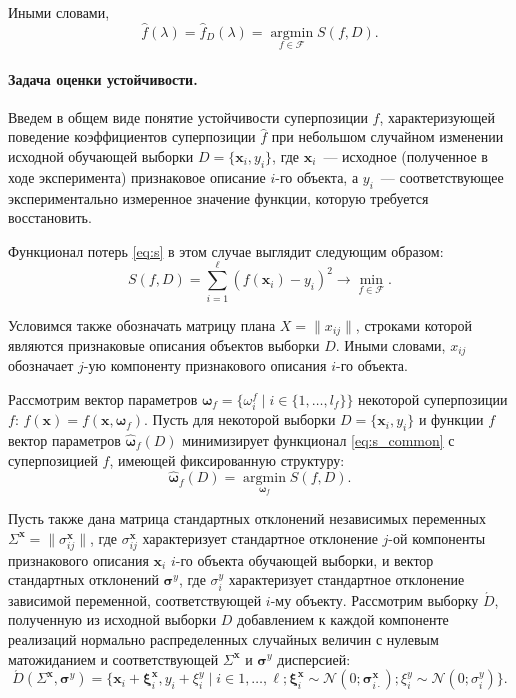 \documentclass[11pt,a4paper]{article}
\theoremstyle{definition}
\begin{document}
Иными словами,
\begin{equation}
  \hat{f}(\lambda) = \hat{f}_D(\lambda) = \mathop{\arg \min}\limits_{f \in \mathcal{F}} S(f, D).
  \label{eq:fhat}
\end{equation}

\paragraph{Задача оценки устойчивости.}
Введем в общем виде понятие устойчивости суперпозиции $f$, характеризующей
поведение коэффициентов суперпозиции $\hat{f}$ при небольшом случайном
изменении исходной обучающей выборки
$D = \{ \mathbf{x}_i, y_i \}$,
где $\mathbf{x}_i$~--- исходное (полученное в ходе эксперимента)
признаковое описание $i$-го объекта, а $y_i$~--- соответствующее экспериментально
измеренное значение функции, которую требуется восстановить.

Функционал потерь \eqref{eq:s} в этом случае выглядит следующим образом: 
\begin{equation}
  S(f, D) = \sum_{i = 1}^\ell (f(\mathbf{x}_i) - y_i)^2 \rightarrow \min_{f \in \mathcal{F}}.
  \label{eq:s_common}
\end{equation}

Условимся также обозначать матрицу плана $X = \| x_{ij} \|$, строками которой
являются признаковые описания объектов выборки $D$. Иными словами, $x_{ij}$
обозначает $j$-ую компоненту признакового описания $i$-го объекта.

Рассмотрим вектор параметров
$\boldsymbol{\omega}_f = \{ \omega_i^f \mid i \in \{ 1, \dots, l_f \} \}$
некоторой суперпозиции $f$: $f(\mathbf{x}) = f(\mathbf{x}, \boldsymbol{\omega}_f)$.
Пусть для некоторой выборки $D = \{ \mathbf{x}_i, y_i \}$ и функции
$f$ вектор параметров $\hat{\boldsymbol{\omega}}_f(D)$ минимизирует
функционал \eqref{eq:s_common} с суперпозицией $f$, имеющей фиксированную
структуру:
\[
  \hat{\boldsymbol{\omega}}_f(D) = \mathop{\arg \min}\limits_{\boldsymbol{\omega}_f} S(f, D).
\]

Пусть также дана матрица стандартных отклонений
независимых переменных $\Sigma^{\mathbf{x}} = \| \sigma^{\mathbf{x}}_{ij} \|$,
где $\sigma^{\mathbf{x}}_{ij}$ характеризует стандартное отклонение $j$-ой
компоненты признакового описания $\mathbf{x}_i$ $i$-го объекта обучающей выборки,
и вектор стандартных отклонений $\boldsymbol{\sigma}^y$, где $\sigma^y_i$
характеризует стандартное отклонение зависимой переменной, соответствующей
$i$-му объекту.
Рассмотрим выборку $\acute{D}$, полученную из исходной выборки $D$
добавлением к каждой компоненте реализаций нормально распределенных
случайных величин с нулевым матожиданием и соответствующей
$\Sigma^{\mathbf{x}}$ и $\boldsymbol{\sigma}^y$ дисперсией:
\begin{equation}
  \acute{D}(\Sigma^{\mathbf{x}}, \boldsymbol{\sigma}^y) = \{ \mathbf{x}_i + \boldsymbol{\xi}^{\mathbf{x}}_i, y_i + \xi^y_i \mid i \in 1, \dots, \ell; \boldsymbol{\xi}^{\mathbf{x}}_i \sim \mathcal{N}(0; \boldsymbol{\sigma}^{\mathbf{x}}_{i \cdot}); \xi^y_i \sim \mathcal{N}(0; \sigma^y_i) \}.
  \label{eq:d_acute}
\end{equation}
\end{document}
